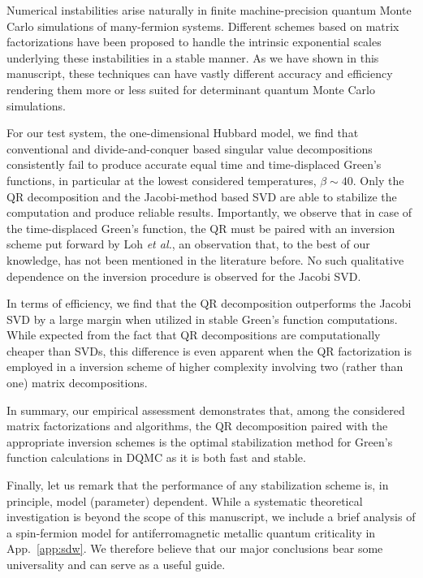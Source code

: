 \documentclass[submission, Phys]{SciPost}
\begin{document}
Numerical instabilities arise naturally in finite machine-precision quantum Monte Carlo simulations of many-fermion systems. Different schemes based on matrix factorizations have been proposed to handle the intrinsic exponential scales underlying these instabilities in a stable manner. As we have shown in this manuscript, these techniques can have vastly different accuracy and efficiency rendering them more or less suited for determinant quantum Monte Carlo simulations.

For our test system, the one-dimensional Hubbard model, we find that conventional and divide-and-conquer based singular value decompositions consistently fail to produce accurate equal time and time-displaced Green's functions, in particular at the lowest considered temperatures, $\beta \sim 40$. Only the QR decomposition and the Jacobi-method based SVD are able to stabilize the computation and produce reliable results. Importantly, we observe that in case of the time-displaced Green's function, the QR must be paired with an inversion scheme put forward by Loh \textit{et al.}\cite{Loh1989}, an observation that, to the best of our knowledge, has not been mentioned in the literature before. No such qualitative dependence on the inversion procedure is observed for the Jacobi SVD.

In terms of efficiency, we find that the QR decomposition outperforms the Jacobi SVD by a large margin when utilized in stable Green's function computations. While expected from the fact that QR decompositions are computationally cheaper than SVDs, this difference is even apparent when the QR factorization is employed in a inversion scheme of higher complexity involving two (rather than one) matrix decompositions.

In summary, our empirical assessment demonstrates that, among the considered matrix factorizations and algorithms, the QR decomposition paired with the appropriate inversion schemes is the optimal stabilization method for Green's function calculations in DQMC as it is both fast and stable.

Finally, let us remark that the performance of any stabilization scheme is, in principle, model (parameter) dependent. While a systematic theoretical investigation is beyond the scope of this manuscript, we include a brief analysis of a spin-fermion model for antiferromagnetic metallic quantum criticality in App.~\ref{app:sdw}. We therefore believe that our major conclusions bear some universality and can serve as a useful guide.
\end{document}
